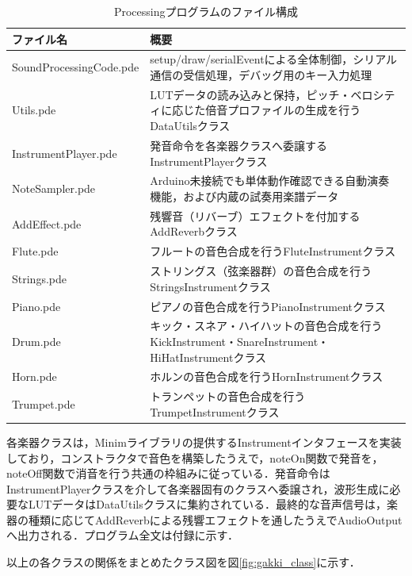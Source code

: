 \begin{table}[H]
    \caption{Processingプログラムのファイル構成}
    \label{table:gakki_files}
    \centering
    \begin{tabular}{|l|p{10cm}|}
        \hline
        ファイル名 & 概要 \\ \hline \hline
        SoundProcessingCode.pde & setup/draw/serialEventによる全体制御，シリアル通信の受信処理，デバッグ用のキー入力処理 \\ \hline
        Utils.pde & LUTデータの読み込みと保持，ピッチ・ベロシティに応じた倍音プロファイルの生成を行うDataUtilsクラス \\ \hline
        InstrumentPlayer.pde & 発音命令を各楽器クラスへ委譲するInstrumentPlayerクラス \\ \hline
        NoteSampler.pde & Arduino未接続でも単体動作確認できる自動演奏機能，および内蔵の試奏用楽譜データ \\ \hline
        AddEffect.pde & 残響音（リバーブ）エフェクトを付加するAddReverbクラス \\ \hline
        Flute.pde & フルートの音色合成を行うFluteInstrumentクラス \\ \hline
        Strings.pde & ストリングス（弦楽器群）の音色合成を行うStringsInstrumentクラス \\ \hline
        Piano.pde & ピアノの音色合成を行うPianoInstrumentクラス \\ \hline
        Drum.pde & キック・スネア・ハイハットの音色合成を行うKickInstrument・SnareInstrument・HiHatInstrumentクラス \\ \hline
        Horn.pde & ホルンの音色合成を行うHornInstrumentクラス \\ \hline
        Trumpet.pde & トランペットの音色合成を行うTrumpetInstrumentクラス \\ \hline
    \end{tabular}
\end{table}

\noindent
各楽器クラスは，Minimライブラリの提供するInstrumentインタフェースを実装しており，コンストラクタで音色を構築したうえで，noteOn関数で発音を，noteOff関数で消音を行う共通の枠組みに従っている．発音命令はInstrumentPlayerクラスを介して各楽器固有のクラスへ委譲され，波形生成に必要なLUTデータはDataUtilsクラスに集約されている．最終的な音声信号は，楽器の種類に応じてAddReverbによる残響エフェクトを通したうえでAudioOutputへ出力される．プログラム全文は付録に示す．


\iffalse
以上の各クラスの関係をまとめたクラス図を図\ref{fig:gakki_class}に示す．

